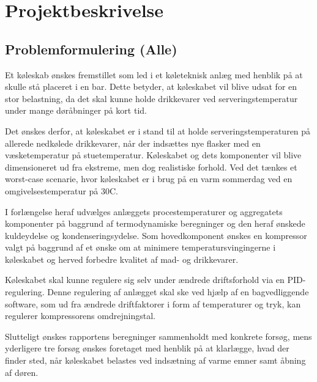\documentclass[../Hovedrapport.tex]{subfiles}
\begin{document}
\chapter{Projektbeskrivelse}
    \label{chap:projektbeskrivelse}
    \vspace{-30pt}
\section{Problemformulering (Alle)}
    \label{sec:pr}
Et køleskab ønskes fremstillet som led i et køleteknisk anlæg med henblik på at skulle stå placeret i en bar. Dette betyder, at køleskabet vil blive udsat for en stor belastning, da det skal kunne holde drikkevarer ved serveringstemperatur under mange døråbninger på kort tid. 

Det ønskes derfor, at køleskabet er i stand til at holde serveringstemperaturen på allerede nedkølede drikkevarer, når der indsættes nye flasker med en væsketemperatur på stuetemperatur. Køleskabet og dets komponenter vil blive dimensioneret ud fra ekstreme, men dog realistiske forhold. Ved det tænkes et worst-case scenarie, hvor køleskabet er i brug på en varm sommerdag ved en omgivelsestemperatur på 30\textdegree C. 

I forlængelse heraf udvælges anlæggets procestemperaturer og aggregatets komponenter på baggrund af termodynamiske beregninger og den heraf ønskede kuldeydelse og kondenseringsydelse. Som hovedkomponent ønskes en kompressor valgt på baggrund af et ønske om at minimere temperatursvingingerne i køleskabet og herved forbedre kvalitet af mad- og drikkevarer.

Køleskabet skal kunne regulere sig selv under ændrede driftsforhold via en PID-regulering. Denne regulering af anlægget skal ske ved hjælp af en bagvedliggende software, som ud fra ændrede driftfaktorer i form af temperaturer og tryk, kan regulerer kompressorens omdrejningstal.

Slutteligt ønskes rapportens beregninger sammenholdt med konkrete forsøg, mens yderligere tre forsøg ønskes foretaget med henblik på at klarlægge, hvad der finder sted, når køleskabet belastes ved indsætning af varme emner samt åbning af døren. 
\end{document}
